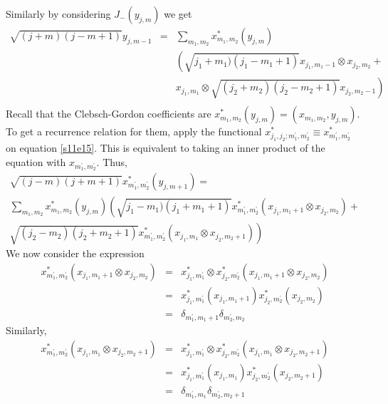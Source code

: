 \documentclass{article}
\numberwithin{equation}{section}
\theoremstyle{plain}
\numberwithin{thm}{section}
\theoremstyle{plain}
\numberwithin{prop}{section}
\theoremstyle{definition}
\numberwithin{defn}{section}
\theoremstyle{remark}
\begin{document}
Similarly by considering $J_-(y_{j,m})$ we get
\begin{eqnarray}
\sqrt{(j+m)(j-m+1)}y_{j,m-1} &=& \sum_{m_1,m_2}x_{m_1,m_2}^\ast (y_{j,m}) 
\nonumber \\
 & & \left(\sqrt{j_1+m_1)(j_1-m_1+1)}x_{j_1,m_1-1} \otimes x_{j_2,m_2}+\right. 
\nonumber \\
 & & \left. x_{j_1,m_1} \otimes \sqrt{(j_2+m_2)(j_2-m_2+1)}x_{j_2,m_2-1}\right)
\nonumber \\
 & & \label{s11e16}
\end{eqnarray}
Recall that the Clebsch-Gordon coefficients are $x_{m_1,m_2}^\ast(y_{j,m}) = 
(x_{m_1,m_2}, y_{j,m})$. To get a recurrence relation for them, apply the 
functional $x_{j_1,j_2;m_1^\prime, m_2^\prime}^\ast \equiv x_{m_1^\prime, 
m_2^\prime}^\ast$ on equation \eqref{s11e15}. This is equivalent to taking an 
inner product of the equation with $x_{m_1^\prime, m_2^\prime}$. Thus,
\begin{equation}\label{s11e17}
\begin{split}
\sqrt{(j-m)(j+m+1)}x^\ast_{m_1^\prime, m_2^\prime}(y_{j,m+1}) =&  \\
 \sum_{m_1,m_2}x_{m_1,m_2}^\ast (y_{j,m}) 
 \left(\sqrt{j_1-m_1)(j_1+m_1+1)}x_{m_1^\prime, m_2^\prime}^\ast
(x_{j_1,m_1+1} \otimes x_{j_2,m_2}) + \right. & \\
  \left. \sqrt{(j_2-m_2)(j_2+m_2+1)}x_{m_1^\prime,m_2^\prime}^\ast
(x_{j_1,m_1} \otimes x_{j_2,m_2+1})\right)
\end{split}
\end{equation}
We now consider the expression
\begin{eqnarray}
x_{m_1^\prime, m_2^\prime}^\ast(x_{j_1,m_1+1} \otimes x_{j_2,m_2}) &=& 
x_{j_1, m_1^\prime}^\ast \otimes x_{j_2, m_2^\prime}^\ast
(x_{j_1,m_1+1} \otimes x_{j_2,m_2})
\nonumber \\
 &=& x_{j_1, m_1^\prime}^\ast(x_{j_1,m_1+1}) x_{j_2, m_2^\prime}^\ast(
x_{j_2,m_2}) \nonumber \\
 &=& \delta_{m_1^\prime, m_1+1} \delta_{m_2^\prime,m_2} \label{s11e18}
\end{eqnarray}
Similarly,
\begin{eqnarray}
x_{m_1^\prime,m_2^\prime}^\ast(x_{j_1,m_1} \otimes x_{j_2,m_2+1}) &=&
 x_{j_1,m_1^\prime}^\ast \otimes x_{j_2,m_2^\prime}^\ast
(x_{j_1,m_1} \otimes x_{j_2,m_2+1}) \nonumber \\
 &=& x_{j_1,m_1^\prime}^\ast(x_{j_1,m_1}) x_{j_2,m_2^\prime}^\ast(x_{j_2,m_2+1})
\nonumber \\
 &=& \delta_{m_1^\prime,m_1} \delta_{m_2^\prime,m_2+1} \label{s11e19}
\end{eqnarray}
\end{document}
